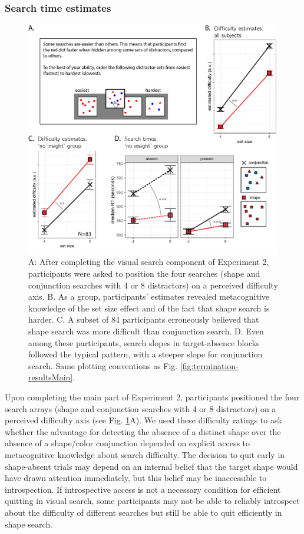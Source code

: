 \documentclass[12pt,twoside]{reedthesis}
\begin{document}
\hypertarget{search-time-estimates}{%
\subsubsection*{Search time estimates}\label{search-time-estimates}}


\begin{figure}
\includegraphics[width=\textwidth]{figure/termination/metacognitive_ratings} \caption[Retrospective search time estimates]{A: After completing the visual search component of Experiment 2, participants were asked to position the four searches (shape and conjunction searches with 4 or 8 distractors) on a perceived difficulty axis. B. As a group, participants' estimates revealed metacognitive knowledge of the set size effect and of the fact that shape search is harder. C. A subset of 84 participants erroneously believed that shape search was more difficult than conjunction search. D. Even among these participants, search slopes in target-absence blocks followed the typical pattern, with a steeper slope for conjunction search. Same plotting conventions as Fig. \ref{fig:termination-resultsMain}.}\label{fig:termination-estimates}
\end{figure}
Upon completing the main part of Experiment 2, participants positioned the four search arrays (shape and conjunction searches with 4 or 8 distractors) on a perceived difficulty axis (see Fig. \ref{fig:termination-estimates}A). We used these difficulty ratings to ask whether the advantage for detecting the absence of a distinct shape over the absence of a shape/color conjunction depended on explicit access to metacognitive knowledge about search difficulty. The decision to quit early in shape-absent trials may depend on an internal belief that the target shape would have drawn attention immediately, but this belief may be inaccessible to introspection. If introspective access is not a necessary condition for efficient quitting in visual search, some participants may not be able to reliably introspect about the difficulty of different searches but still be able to quit efficiently in shape search.
\end{document}
